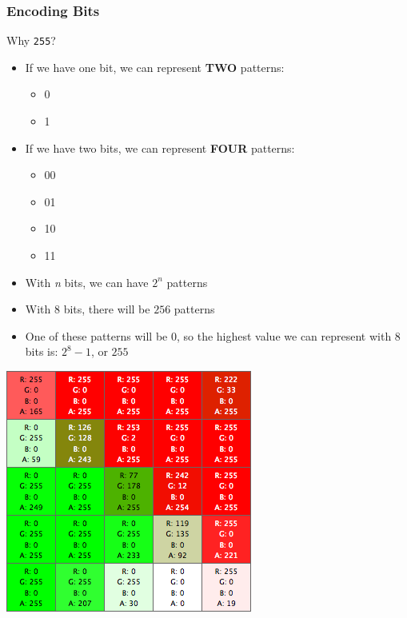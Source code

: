 \begin{frame}
	\frametitle{Encoding Bits}
	
	Why \texttt{255}?
	
	\begin{itemize}
		\item If we have one bit, we can represent \textbf{TWO} patterns:
		\begin{itemize}
			\item 0
			\item 1
		\end{itemize}
		
		\item If we have two bits, we can represent \textbf{FOUR} patterns:
		\begin{itemize}
			\item 00
			\item 01
			\item 10
			\item 11
		\end{itemize}
		\item With \textit{n} bits, we can have $2^n$ patterns
		\item With $8$ bits, there will be $256$ patterns
		\item One of these patterns will be $0$, so the highest value we can represent with $8$ bits is: $2^8 - 1$, or $255$
	\end{itemize}
\end{frame}
\begin{frame}
	\begin{center}
		\includegraphics[scale=0.5]{rgb_pallette}
	\end{center}	
\end{frame}
